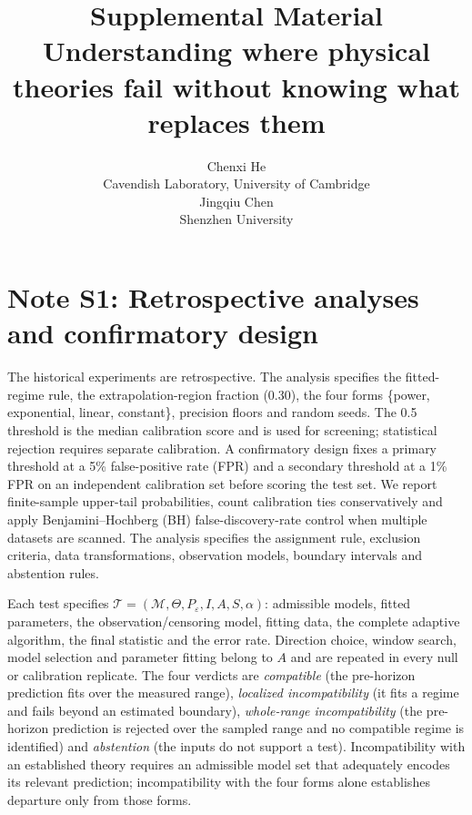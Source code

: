 \documentclass{article}
\title{Supplemental Material\\[6pt]
\large Understanding where physical theories fail without knowing what replaces them}
\author{%
  Chenxi He \\ Cavendish Laboratory, University of Cambridge \\
  \And
  Jingqiu Chen \\ Shenzhen University \\
}
\begin{document}
\maketitle

\section{Note S1: Retrospective analyses and confirmatory design}

The historical experiments are retrospective. The analysis specifies the fitted-regime rule, the extrapolation-region fraction (0.30), the four forms \{power, exponential, linear, constant\}, precision floors and random seeds. The 0.5 threshold is the median calibration score and is used for screening; statistical rejection requires separate calibration. A confirmatory design fixes a primary threshold at a 5\% false-positive rate (FPR) and a secondary threshold at a 1\% FPR on an independent calibration set before scoring the test set. We report finite-sample upper-tail probabilities, count calibration ties conservatively and apply Benjamini--Hochberg (BH) false-discovery-rate control when multiple datasets are scanned. The analysis specifies the assignment rule, exclusion criteria, data transformations, observation models, boundary intervals and abstention rules.

Each test specifies \(\mathcal{T}=(\mathcal{M},\Theta,P_\varepsilon,I,A,S,\alpha)\): admissible models, fitted parameters, the observation/censoring model, fitting data, the complete adaptive algorithm, the final statistic and the error rate. Direction choice, window search, model selection and parameter fitting belong to \(A\) and are repeated in every null or calibration replicate. The four verdicts are \emph{compatible} (the pre-horizon prediction fits over the measured range), \emph{localized incompatibility} (it fits a regime and fails beyond an estimated boundary), \emph{whole-range incompatibility} (the pre-horizon prediction is rejected over the sampled range and no compatible regime is identified) and \emph{abstention} (the inputs do not support a test). Incompatibility with an established theory requires an admissible model set that adequately encodes its relevant prediction; incompatibility with the four forms alone establishes departure only from those forms.
\end{document}
